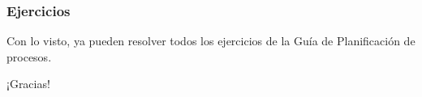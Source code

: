 \documentclass[aspectratio=169]{beamer}
\begin{document}
\begin{frame}[fragile]
    \frametitle{Ejercicios}
    \vfill
    Con lo visto, ya pueden resolver todos los ejercicios de la Guía de Planificación de procesos.
    \vfill
\end{frame}

\begin{frame}[plain]
    \begin{center}
    \vspace{2cm}
    \huge ¡Gracias!\\
    \vspace{2cm}
    \end{center}
\end{frame}
\end{document}
